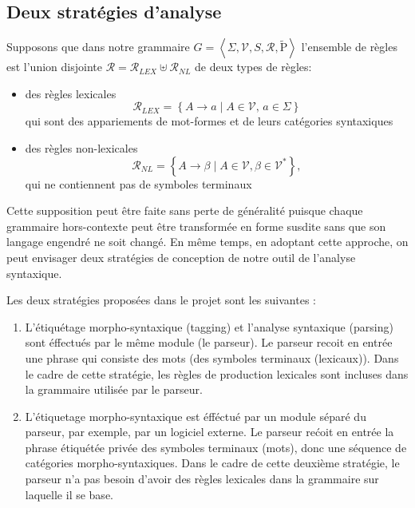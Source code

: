 \documentclass[12pt]{article}
\begin{document}
\subsection{Deux strat\'egies d'analyse}

Supposons que dans notre grammaire $G = \left< \Sigma, \mathscr{V}, S, \mathscr{R}, \tilde{\mathrm{P}} \right>$ l'ensemble de r\`egles est l'union disjointe $\mathscr{R} = \mathscr{R}_{LEX} \uplus \mathscr{R}_{NL}$ de deux types de r\`egles:

\begin{itemize}
\item des r\`egles lexicales
$$\mathscr{R}_{LEX} = \left\{ A \rightarrow a \mid
        A \in \mathscr{V}, \, a \in \Sigma \right\}$$
qui sont des appariements de mot-formes et de leurs cat\'egories syntaxiques
\item des r\`egles non-lexicales
$$\mathscr{R}_{NL} = \left\{ A \rightarrow \beta \mid
     A \in \mathscr{V}, \beta \in \mathscr{V}^* \right\},$$
qui ne contiennent pas de symboles terminaux
\end{itemize}

Cette supposition peut \^etre faite sans perte de g\'en\'eralit\'e puisque
chaque grammaire hors-contexte peut \^etre transform\'ee en forme susdite sans
que son langage engendr\'e ne soit chang\'e. En m\^eme temps, en adoptant cette
approche, on peut envisager deux strat\'egies de conception de notre outil de
l'analyse syntaxique.

Les deux strat\'egies propos\'ees dans le projet sont les suivantes :
\begin{enumerate}
  \item L'\'etiqu\'etage morpho-syntaxique (tagging) et l'analyse syntaxique
  (parsing) sont \'effectu\'es par le m\^eme module (le parseur). Le
  parseur recoit en entr\'ee une phrase qui consiste des mots (des symboles terminaux (lexicaux)).
  Dans le cadre de cette strat\'egie, les r\`egles de production lexicales sont
  incluses dans la grammaire utilis\'ee par le parseur.
  \item L'\'etiquetage morpho-syntaxique est \'eff\'ectu\'e par un module s\'epar\'e du
  parseur, par exemple, par un logiciel externe. Le parseur re\'coit en entr\'ee la
  phrase \'etiqu\'et\'ee priv\'ee des symboles terminaux (mots), donc une s\'equence de
  cat\'egories morpho-syntaxiques. Dans le cadre de cette deuxi\`eme strat\'egie, le
  parseur n'a pas besoin d'avoir des r\`egles lexicales dans la grammaire sur
  laquelle il se base.
\end{enumerate}
\end{document}
